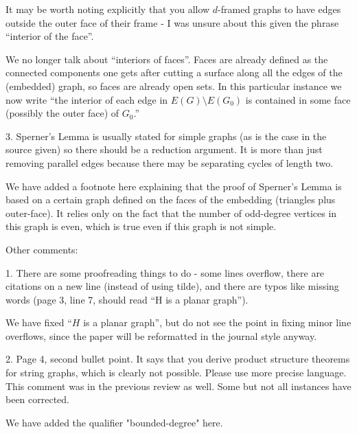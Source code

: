 \documentclass[12pt]{article}
\newenvironment{response}{\color{blue}}{}
\begin{document}
It may be worth noting explicitly that you allow $d$-framed graphs to
have edges outside the outer face of their frame - I was unsure about
this given the phrase “interior of the face”.

\begin{response}
  We no longer talk about ``interiors of faces''.  Faces are already defined as the connected components one gets after cutting a surface along all the edges of the (embedded) graph, so faces are already open sets.  In this particular instance we now write ``the interior of each edge in $E(G)\setminus E(G_0)$ is contained in some face (possibly the outer face) of $G_0$.''
\end{response}

3. Sperner’s Lemma is usually stated for simple graphs (as is the case
in the source given) so there should be a reduction argument. It is
more than just removing parallel edges because there may be separating
cycles of length two.

\begin{response}
  We have added a footnote here explaining that the proof of Sperner's Lemma is based on a certain graph defined on the faces of the embedding (triangles plus outer-face).  It relies only on the fact that the number of odd-degree vertices in this graph is even, which is true even if this graph is not simple.
\end{response}

Other comments:

1. There are some proofreading things to do - some lines overflow, there
are citations on a new line (instead of using tilde), and there are typos
like missing words (page 3, line 7, should read “H is a planar graph”).

\begin{response}
	We have fixed ``$H$ is a planar graph'', but do not see the point in fixing minor line overflows, since the paper will be reformatted in the journal style anyway.
\end{response}


2. Page 4, second bullet point. It says that you derive product structure
theorems for string graphs, which is clearly not possible. Please use
more precise language. This comment was in the previous review as
well. Some but not all instances have been corrected.

\begin{response}
  We have added the qualifier "bounded-degree" here.
\end{response}
\end{document}
